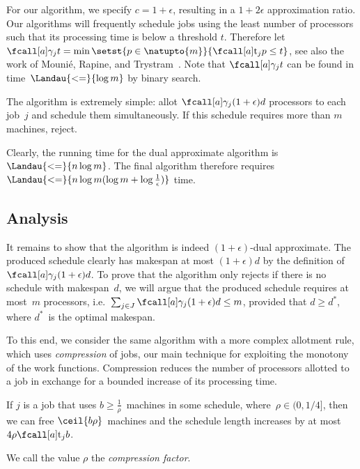 For our algorithm, we specify $c = 1 + \epsilon$,
resulting in a $1 + 2 \epsilon$ approximation ratio.
Our algorithms will frequently schedule jobs using the least number of processors
such that its processing time is below a threshold $t$.
Therefore let~$\procnum{j}{t} = \min \setst{p \in \natupto{m}}{\ptm{j}{p} \leq t}$,
see also the work of Mounié, Rapine, and Trystram~\cite{mounie07}.
Note that $\procnum{j}{t}$ can be found in time~$\Landau{<=}{\log m}$ by binary search.

The algorithm is extremely simple:
allot $\procnum{j}{(1+\epsilon) d}$ processors to each job~$j$
and schedule them simultaneously.
If this schedule requires more than $m$ machines, reject.

Clearly, the running time for the dual approximate algorithm is $\Landau{<=}{n \log m}$.
The final algorithm therefore requires
$\Landau{<=}{n \log m (\log m + \log \frac{1}{\epsilon})}$ time.


\subsection{Analysis}

It remains to show that the algorithm is indeed $(1+\epsilon)$-dual approximate.
The produced schedule clearly has makespan at most $(1+\epsilon) d$
by the definition of $\procnum{j}{(1+\epsilon) d}$.
To prove that the algorithm only rejects if there is no schedule with makespan~$d$,
we will argue that the produced schedule requires at most~$m$ processors,
i.e.~$\sum_{j \in J} \procnum{j}{(1+\epsilon) d} \leq m$,
provided that $d \geq d^*$,
where $d^*$~is the optimal makespan.

To this end, we consider the same algorithm with a more complex allotment rule,
which uses \emph{compression} of jobs,
our main technique for exploiting the monotony of the work functions.
Compression reduces the number of processors allotted to a job
in exchange for a bounded increase of its processing time.

\begin{lemma}
  \label{lemma:compression}
  If $j$ is a job that uses $b \geq \frac{1}{\rho}$~machines in some schedule,
  where~$\rho \in (0, 1/4]$,
  then we can free $\ceil{b\rho}$~machines and the schedule length increases
  by at most~$4\rho \ptm{j}{b}$.
\end{lemma}
We call the value $\rho$ the \emph{compression factor}.

